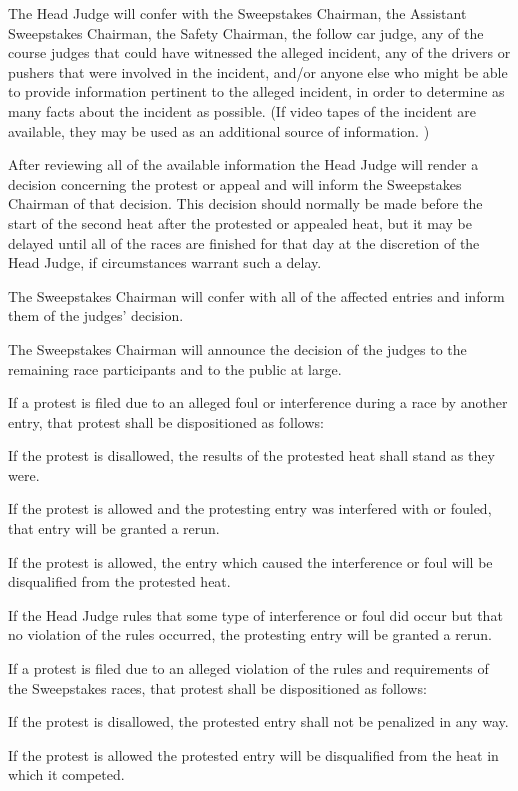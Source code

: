 The Head Judge will confer with the Sweepstakes Chairman, the Assistant Sweepstakes Chairman, the Safety Chairman, the follow car judge, any of the course judges that could have witnessed the alleged incident, any of the drivers or pushers that were involved in the incident, and/or anyone else who might be able to provide information pertinent to the alleged incident, in order to determine as many facts about the incident as possible. (If video tapes of the incident are available, they may be used as an additional source of information. )

After reviewing all of the available information the Head Judge will render a decision concerning the protest or appeal and will inform the Sweepstakes Chairman of that decision. This decision should normally be made before the start of the second heat after the protested or appealed heat, but it may be delayed until all of the races are finished for that day at the discretion of the Head Judge, if circumstances warrant such a delay.

The Sweepstakes Chairman will confer with all of the affected entries and inform them of the judges' decision.

The Sweepstakes Chairman will announce the decision of the judges to the remaining race participants and to the public at large.

If a protest is filed due to an alleged foul or interference during a race by another entry, that protest shall be dispositioned as follows:

If the protest is disallowed, the results of the protested heat shall stand as they were.

If the protest is allowed and the protesting entry was interfered with or fouled, that entry will be granted a rerun.

If the protest is allowed, the entry which caused the interference or foul will be disqualified from the protested heat.

If the Head Judge rules that some type of interference or foul did occur but that no violation of the rules occurred, the protesting entry will be granted a rerun.

If a protest is filed due to an alleged violation of the rules and requirements of the Sweepstakes races, that protest shall be dispositioned as follows:

If the protest is disallowed, the protested entry shall not be penalized in any way.

If the protest is allowed the protested entry will be disqualified from the heat in which it competed.

